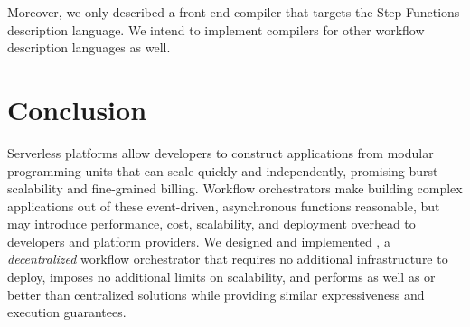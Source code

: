 Moreover, we only described a front-end compiler that targets the Step Functions
description language. We intend to implement compilers for other workflow
description languages as well.

\section{Conclusion}\label{sec:conclusion}

Serverless platforms allow developers to construct applications from modular
programming units that can scale quickly and independently, promising
burst-scalability and fine-grained billing. Workflow orchestrators make building
complex applications out of these event-driven, asynchronous functions
reasonable, but may introduce performance, cost, scalability, and deployment
overhead to developers and platform providers. We designed and implemented
\name{}, a \emph{decentralized} workflow orchestrator that requires no
additional infrastructure to deploy, imposes no additional limits on
scalability, and performs as well as or better than centralized solutions while
providing similar expressiveness and execution guarantees.
